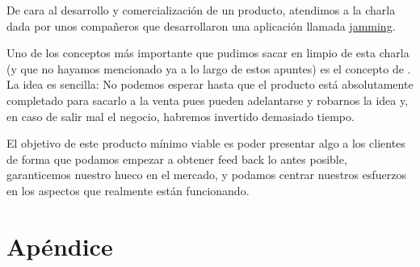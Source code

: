 \documentclass[nochap,palatino,shortheader]{apuntes}
\begin{document}
De cara al desarrollo y comercialización de un producto, atendimos a la charla dada por unos compañeros que desarrollaron una aplicación llamada \href{buscarurl}{jamming}.

Uno de los conceptos más importante que pudimos sacar en limpio de esta charla (y que no hayamos mencionado ya a lo largo de estos apuntes) es el concepto de . La idea es sencilla: No podemos esperar hasta que el producto está absolutamente completado para sacarlo a la venta pues pueden adelantarse y robarnos la idea y, en caso de salir mal el negocio, habremos invertido demasiado tiempo.

El objetivo de este producto mínimo viable es poder presentar algo a los clientes de forma que podamos empezar a obtener feed back lo antes posible, garanticemos nuestro hueco en el mercado, y podamos centrar nuestros esfuerzos en los aspectos que realmente están funcionando.


\newpage
\section{Apéndice}

\label{sec:CreacionEmpresa}


\label{sec:cicloExplotacion}


\label{sec:contabilidad}


\label{sec:circuitoContableIntegrado}


\label{sec:Fruteria}


\label{sec:Prestamos}


\label{sec:ProyectoInversion}



\printindex
\end{document}
